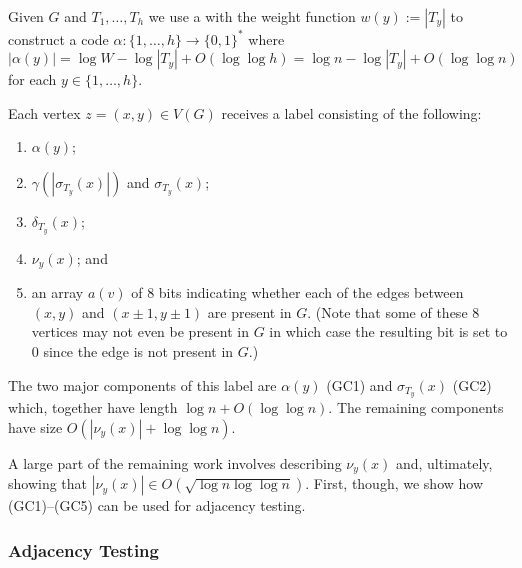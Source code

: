 \documentclass[kpfonts]{patmorin}
\begin{document}
Given $G$ and $T_{1},\ldots,T_h$ we use a  with the weight function $w(y):=|T_y|$ to construct a code $\alpha:\{1,\ldots,h\}\to\{0,1\}^*$ where
\[  
  |\alpha(y)| = \log W-\log|T_y| + O(\log\log h) = \log n - \log|T_y| + O(\log\log n)
\]
for each $y\in\{1,\ldots,h\}$.  

Each vertex $z=(x,y)\in V(G)$ receives a label consisting of the following:  
\begin{enumerate}[(GC1)]
  \item $\alpha(y)$;
  \item $\gamma(|\sigma_{T_y}(x)|)$ and $\sigma_{T_y}(x)$;    
  \item $\delta_{T_y}(x)$;
  \item $\nu_y(x)$; and
  \item an array $a(v)$ of $8$ bits indicating whether each of the edges between $(x,y)$ and $(x\pm 1,y\pm 1)$ are present in $G$.  (Note that some of these 8 vertices may not even be present in $G$ in which case the resulting bit is set to 0 since the edge is not present in $G$.)
\end{enumerate}
The two major components of this label are $\alpha(y)$ (GC1) and $\sigma_{T_y}(x)$ (GC2) which, together have length $\log n + O(\log\log n)$.  The remaining components have size $O(|\nu_y(x)|+\log\log n)$.  

A large part of the remaining work involves describing $\nu_y(x)$ and, ultimately, showing that $|\nu_y(x)|\in O(\sqrt{\log n\log\log n})$. First, though, we show how (GC1)--(GC5) can be used for adjacency testing.

\subsubsection{Adjacency Testing}
\end{document}
